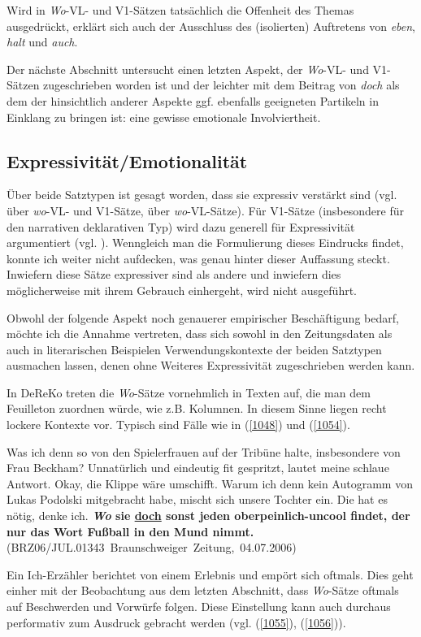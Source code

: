 {Wird in \textit{Wo}-VL- und V1-Sätzen tatsächlich die Offenheit des Themas ausgedrückt, erklärt sich auch der Ausschluss des (isolierten) Auftretens von \textit{eben}, \textit{halt} und \textit{auch}.

Der nächste Abschnitt untersucht einen letzten Aspekt, der \textit{Wo}-VL- und V1-Sätzen zugeschrieben worden ist und der leichter mit dem Beitrag von \textit{doch} als dem der hinsichtlich anderer Aspekte ggf. ebenfalls geeigneten Partikeln in Einklang zu bringen ist: eine gewisse emotionale Involviertheit.

\subsection{Expressivität/Emotionalität}
\label{sec:litdoch}
Über beide Satztypen ist gesagt worden, dass sie expressiv verstärkt sind (vgl. \citealt[204]{Oppenrieder1989} über \textit{wo}-VL- und V1-Sätze, \citeyear[42]{Oppenrieder2013} über \textit{wo}-VL-Sätze). Für V1-Sätze (insbesondere für den narrativen deklarativen Typ) wird dazu generell für Expressivität argumentiert (vgl. \citealt[218]{Reis2000}). Wenngleich man die Formulierung dieses Eindrucks findet, konnte ich weiter nicht aufdecken, was genau hinter dieser Auffassung steckt. Inwiefern diese Sätze expressiver  sind als andere und inwiefern dies möglicherweise mit ihrem Gebrauch einhergeht, wird nicht ausgeführt.

Obwohl der folgende Aspekt noch genauerer empirischer Beschäftigung bedarf, möchte ich die Annahme vertreten, dass sich sowohl in den Zeitungsdaten als auch in literarischen Beispielen Verwendungskontexte der beiden Satztypen ausmachen lassen, denen ohne Weiteres Expressivität zugeschrieben werden kann.

In DeReKo treten die \textit{Wo}-Sätze vornehmlich in Texten auf, die man dem Feuilleton zuordnen würde, wie z.B. Kolumnen. In diesem Sinne liegen recht \glq lockere\grq {} Kontexte vor. Typisch sind Fälle wie in (\ref{1048}) und (\ref{1054}).

\begin{exe}
	\ex\label{1054} 
	\scriptsize
	Was ich denn so von den Spielerfrauen auf der Tribüne halte, insbesondere von Frau Beckham? Unnatürlich und eindeutig fit gespritzt, lautet meine 			schlaue Antwort. Okay, die Klippe wäre umschifft. Warum ich denn kein Autogramm von Lukas Podolski mitgebracht habe, mischt sich unsere Tochter ein. 		Die hat es nötig, denke ich. \textbf{\textit{Wo} sie \underline{doch} sonst jeden oberpeinlich-uncool findet, der nur das Wort Fußball in den Mund 			nimmt.}
	\hfill\hbox {(BRZ06/JUL.01343 Braunschweiger Zeitung, 04.07.2006)}
\end{exe}
Ein Ich-Erzähler berichtet von einem Erlebnis und empört sich oftmals. Dies geht einher mit der Beobachtung aus dem letzten Abschnitt, dass \textit{Wo}-Sätze oftmals auf Beschwerden und Vorwürfe folgen. Diese Einstellung kann auch durchaus performativ zum Ausdruck gebracht werden (vgl. (\ref{1055}), (\ref{1056})).

}

